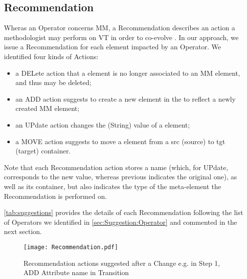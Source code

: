 \subsection{Recommendation}
\label{sec:Suggestion:Recommendation}

Wheras an \textsf{Operator} concerns \textsf{MM}, a \textsf{Recommendation} 
describes an action a methodologist may perform on \textsf{VT} in order to
co-evolve \viewtypes. 
In our approach, we issue a \textsf{Recommendation} for each \viewtype element 
\textsf{impacted} by an \textsf{Operator}. We identified four kinds of \textsf{Action}s: 
\begin{itemize}
	\item a \textsf{DEL}ete action that a \viewtype element is no longer associated
	to an \textsf{MM} element, and thus may be deleted;
	\item an \textsf{ADD} action suggests to create a new element in the \viewtype
	to reflect a newly created \textsf{MM} element;
	\item an \textsf{UP}date action changes the (String) value of a \viewtype element;
	\item a \textsf{MOVE} action suggests to move a \viewtype element from a \textsf{src}
	(source) to \textsf{tgt} (target) container.
\end{itemize}
Note that each \textsf{Recommendation} action stores a \textsf{name} (which, for
\textsf{UP}date, corresponds to the new value, whereas \textsf{previous} 
indicates the original one), as well as its \textsf{container}, but also 
indicates the \textsf{type} of the \viewtype meta-element the 
\textsf{Recommendation} is performed on.

\cref{tab:suggestions} provides the details of each \textsf{Recommendation} 
following the list of \textsf{Operator}s we identified in 
\cref{sec:Suggestion:Operator} and commented in the next section.

\begin{figure}[t]
    \centering
    \texttt{[image: Recommendation.pdf]}
    \caption{\textsf{Recommendation} actions suggested after a \textsf{Change}
    e.g. in Step 1, \textsf{ADD} Attribute \textsf{name} in \textsf{Transition}}
    \label{fig:Recommendation}
\end{figure}
